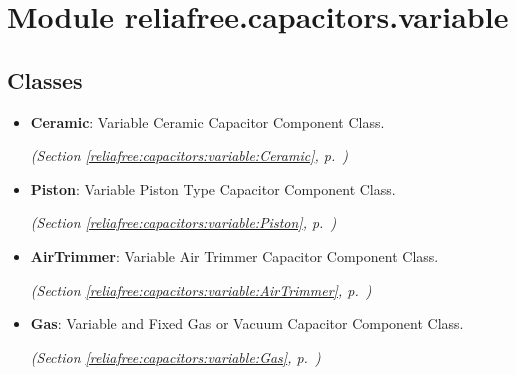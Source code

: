 %
%
%


\section{Module reliafree.capacitors.variable}

    \label{reliafree:capacitors:variable}


\subsection{Classes}

\begin{itemize}  \setlength{\parskip}{0ex}
  \item \textbf{Ceramic}: Variable Ceramic Capacitor Component Class.



  \textit{(Section \ref{reliafree:capacitors:variable:Ceramic}, p.~\pageref{reliafree:capacitors:variable:Ceramic})}

  \item \textbf{Piston}: Variable Piston Type Capacitor Component Class.



  \textit{(Section \ref{reliafree:capacitors:variable:Piston}, p.~\pageref{reliafree:capacitors:variable:Piston})}

  \item \textbf{AirTrimmer}: Variable Air Trimmer Capacitor Component Class.



  \textit{(Section \ref{reliafree:capacitors:variable:AirTrimmer}, p.~\pageref{reliafree:capacitors:variable:AirTrimmer})}

  \item \textbf{Gas}: Variable and Fixed Gas or Vacuum Capacitor Component Class.



  \textit{(Section \ref{reliafree:capacitors:variable:Gas}, p.~\pageref{reliafree:capacitors:variable:Gas})}

\end{itemize}

